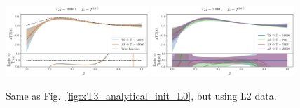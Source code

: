 \begin{figure}[ht!]
\centering
  \includegraphics[width=0.48\textwidth]{plots/analytical_solution/xT3/evolution/from_f0/L2/linear/evolution_epoch_50000_L2_linear.pdf}
  \includegraphics[width=0.48\textwidth]{plots/analytical_solution/xT3/evolution/from_f0/L2/linear/evolution_epochs_700_5000_20000_L2_linear.pdf}
\caption{Same as Fig.~\ref{fig:xT3_analytical_init_L0}, but using L2 data.}
\label{fig:xT3_analytical_init_L2}
\end{figure}

\FloatBarrier




